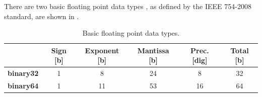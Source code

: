There are two basic floating point  data types , as defined by the IEEE 754-2008 \cite{ieee754} standard, are shown in .

\begin{table}[htb]
\begin{center}
\begin{tabular}{|r|c|c|c||c||c|}
\cline{2-6}

\multicolumn{1}{r|}{} & {\vrule height 13pt depth 6pt width 0pt\bf Sign} [b] & {\bf Exponent} [b] & {\bf Mantissa} [b] & {\bf Prec.} [dig] & {\bf Total} [b]\\ \cline{2-6}  \hline

\vrule height 10pt depth 20pt width 0pt
{\bf binary32}   			& 1    & 8        	& 24      & 8  	& 32\\ \hline

\vrule height 20pt depth 0pt width 1pt
{\bf binary64}   			& 1    & 11       	& 53      & 16	& 64\\ \hline
\end{tabular}
\end{center}
\caption{Basic floating point data types.}
\label{tab.floatingpointdatatypes}
\end{table}
